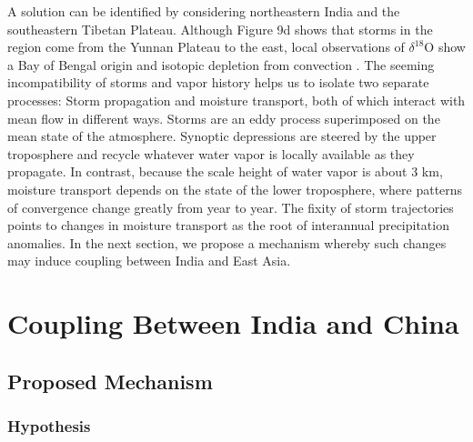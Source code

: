 \documentclass[12pt]{article}
\begin{document}
	 A solution can be identified by considering northeastern India and the southeastern Tibetan Plateau. Although Figure 9d shows that storms in the region come from the Yunnan Plateau to the east, local observations of $\delta^{18}$O show a Bay of Bengal origin and isotopic depletion from convection \citep{Gao2011}. The seeming incompatibility of storms and vapor history helps us to isolate two separate processes: Storm propagation and moisture transport, both of which interact with mean flow in different ways. Storms are an eddy process superimposed on the mean state of the atmosphere. Synoptic depressions are steered by the upper troposphere and recycle whatever water vapor is locally available as they propagate. In contrast, because the scale height of water vapor is about 3 km, moisture transport depends on the state of the lower troposphere, where patterns of convergence change greatly from year to year. The fixity of storm trajectories points to changes in moisture transport as the root of interannual precipitation anomalies. In the next section, we propose a mechanism whereby such changes may induce coupling between India and East Asia.
	
\section{Coupling Between India and China}

\subsection{Proposed Mechanism}

\subsubsection{Hypothesis}
\end{document}
